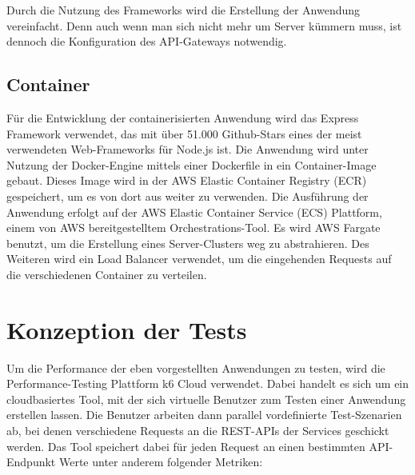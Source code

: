 Durch die Nutzung des Frameworks wird die Erstellung der Anwendung vereinfacht. Denn auch wenn man sich nicht mehr um Server kümmern muss, ist dennoch die Konfiguration des API-Gateways notwendig.

\subsection{Container}
Für die Entwicklung der containerisierten Anwendung wird das Express Framework verwendet, das mit über 51.000 Github-Stars eines der meist verwendeten Web-Frameworks für Node.js ist. Die Anwendung wird unter Nutzung der Docker-Engine mittels einer Dockerfile in ein Container-Image gebaut. Dieses Image wird in der AWS Elastic Container Registry (ECR) gespeichert, um es von dort aus weiter zu verwenden. 
Die Ausführung der Anwendung erfolgt auf der AWS Elastic Container Service (ECS) Plattform, einem von AWS bereitgestelltem Orchestrations-Tool. Es wird AWS Fargate benutzt, um die Erstellung eines Server-Clusters weg zu abstrahieren. Des Weiteren wird ein Load Balancer verwendet, um die eingehenden Requests auf die verschiedenen Container zu verteilen. 

\section{Konzeption der Tests}
Um die Performance der eben vorgestellten Anwendungen zu testen, wird die Performance-Testing Plattform k6 Cloud\cite{noauthor_load_nodate} verwendet. Dabei handelt es sich um ein cloudbasiertes Tool, mit der sich virtuelle Benutzer zum Testen einer Anwendung erstellen lassen. Die Benutzer arbeiten dann parallel vordefinierte Test-Szenarien ab, bei denen verschiedene Requests an die REST-APIs der Services geschickt werden. Das Tool speichert dabei für jeden Request an einen bestimmten API-Endpunkt Werte unter anderem folgender Metriken: 

